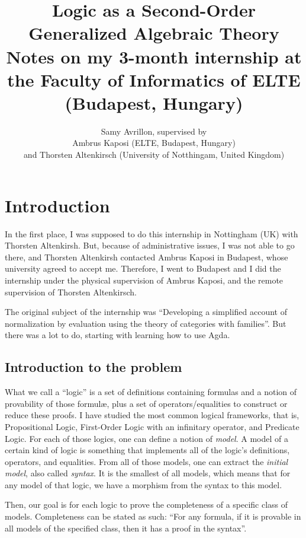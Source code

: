 \documentclass[10pt,a4paper]{article}
\title{Logic as a Second-Order Generalized Algebraic Theory
	\\[1ex] \large Notes on my 3-month internship at the Faculty of Informatics of ELTE (Budapest, Hungary)}
\author{Samy Avrillon, supervised by
	\\[1ex] Ambrus Kaposi (ELTE, Budapest, Hungary)
	\\[1ex] and Thorsten Altenkirsch (University of Notthingam, United Kingdom)}
\begin{document}
	\doparttoc
	\maketitle
	
	\hsep
	
	\tableofcontents
	
	\newpage
	
	
	\section{Introduction}
	
		In the first place, I was supposed to do this internship in Nottingham (UK) with Thorsten Altenkirsh. But, because of administrative issues, I was not able to go there, and Thorsten Altenkirsh contacted Ambrus Kaposi in Budapest, whose university agreed to accept me. Therefore, I went to Budapest and I did the internship under the physical supervision of Ambrus Kaposi, and the remote supervision of Thorsten Altenkirsch.
		
		The original subject of the internship was \enquote{Developing a simplified account of normalization by evaluation using the theory of categories with families}. But there was a lot to do, starting with learning how to use Agda.
		
		\subsection{Introduction to the problem}
			What we call a \enquote{logic} is a set of definitions containing formulas and a notion of provability of those formulæ, plus a set of operators/equalities to construct or reduce these proofs. I have studied the most common logical frameworks, that is, Propositional Logic, First-Order Logic with an infinitary operator, and Predicate Logic. For each of those logics, one can define a notion of \emph{model}. A model of a certain kind of logic is something that implements all of the logic's definitions, operators, and equalities. From all of those models, one can extract the \emph{initial model}, also called \emph{syntax}. It is the smallest of all models, which means that for any model of that logic, we have a morphism from the syntax to this model.
			
			Then, our goal is for each logic to prove the completeness of a specific class of models. Completeness can be stated as such: \enquote{For any formula, if it is provable in all models of the specified class, then it has a proof in the syntax}.
			
\end{document}
